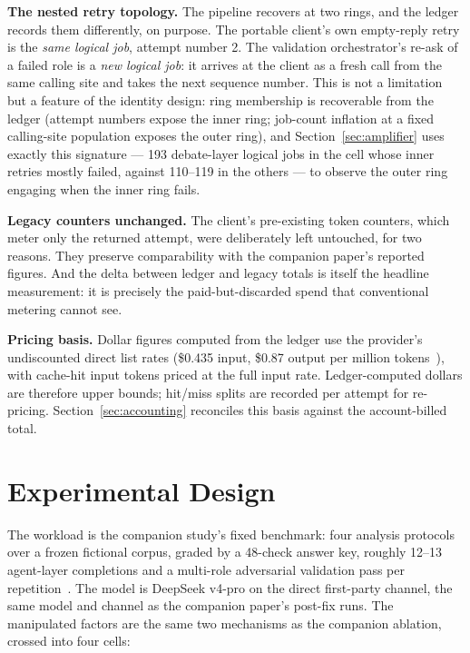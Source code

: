 \documentclass[11pt]{article}
\begin{document}
\textbf{The nested retry topology.} The pipeline recovers at two rings,
and the ledger records them differently, on purpose. The portable
client's own empty-reply retry is the \emph{same logical job}, attempt
number 2. The validation orchestrator's re-ask of a failed role is a
\emph{new logical job}: it arrives at the client as a fresh call from
the same calling site and takes the next sequence number. This is not a
limitation but a feature of the identity design: ring membership is
recoverable from the ledger (attempt numbers expose the inner ring;
job-count inflation at a fixed calling-site population exposes the
outer ring), and Section~\ref{sec:amplifier} uses exactly this
signature --- 193 debate-layer logical jobs in the cell whose inner
retries mostly failed, against 110--119 in the others --- to observe
the outer ring engaging when the inner ring fails.

\textbf{Legacy counters unchanged.} The client's pre-existing token
counters, which meter only the returned attempt, were deliberately left
untouched, for two reasons. They preserve comparability with the
companion paper's reported figures. And the delta between ledger and
legacy totals is itself the headline measurement: it is precisely the
paid-but-discarded spend that conventional metering cannot see.

\textbf{Pricing basis.} Dollar figures computed from the ledger use the
provider's undiscounted direct list rates (\$0.435 input, \$0.87 output
per million tokens~\cite{deepseekdocs}), with cache-hit input tokens
priced at the full input rate. Ledger-computed dollars are therefore
upper bounds; hit/miss splits are recorded per attempt for
re-pricing. Section~\ref{sec:accounting} reconciles this basis against
the account-billed total.

\section{Experimental Design}\label{sec:design}

The workload is the companion study's fixed benchmark: four analysis
protocols over a frozen fictional corpus, graded by a 48-check answer
key, roughly 12--13 agent-layer completions and a multi-role
adversarial validation pass per repetition~\cite{reliability}. The
model is DeepSeek v4-pro on the direct first-party channel, the same
model and channel as the companion paper's post-fix runs. The
manipulated factors are the same two mechanisms as the companion
ablation, crossed into four cells:
\end{document}
